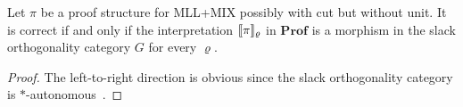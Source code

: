 \begin{theorem}
    Let \( \pi \) be a proof structure for \textsf{MLL+MIX} possibly with cut but without unit.
    It is correct if and only if the interpretation \( \llbracket{\pi}\rrbracket_\varrho \) in \( \mathbf{Prof} \) is a morphism in the slack orthogonality category \( G \) for every \( \varrho \).
\end{theorem}
\begin{proof}
    The left-to-right direction is obvious since the slack orthogonality category is \( * \)-autonomous~\cite{Hyland2003}.
\end{proof}

